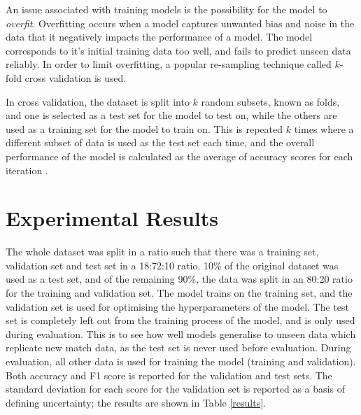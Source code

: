 An issue associated with training models is the possibility for the model to \textit{overfit}. Overfitting occurs when a model captures unwanted bias and noise in the data that it negatively impacts the performance of a model. The model corresponds to it's initial training data too well, and fails to predict unseen data reliably. In order to limit overfitting, a popular re-sampling technique called $k$-fold cross validation is used.

In cross validation, the dataset is split into $k$ random subsets, known as folds, and one is selected as a test set for the model to test on, while the others are used as a training set for the model to train on. This is repeated $k$ times where a different subset of data is used as the test set each time, and the overall performance of the model is calculated as the average of accuracy scores for each iteration \cite{berrar2019cross}.

\section{Experimental Results} \label{experresults}
The whole dataset was split in a ratio such that there was a training set, validation set and test set in a 18:72:10 ratio. 10\% of the original dataset was used as a test set, and of the remaining 90\%, the data was split in an 80:20 ratio for the training and validation set.
The model trains on the training set, and the validation set is used for optimising the hyperparameters of the model.
The test set is completely left out from the training process of the model, and is only used during evaluation. This is to see how well models generalise to unseen data which replicate new match data, as the test set is never used before evaluation. During evaluation, all other data is used for training the model (training and validation).
Both accuracy and F1 score is reported for the validation and test sets. The standard deviation for each score for the validation set is reported as a basis of defining uncertainty; the results are shown in Table \ref{results}.

